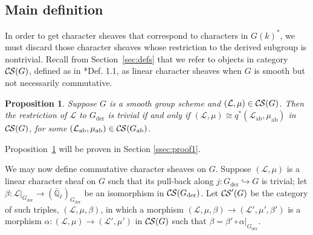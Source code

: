 \documentclass[10pt]{amsart}
\theoremstyle{plain}
\newtheorem{proposition}[theorem]{Proposition}
\theoremstyle{definition}
\newcommand{\EE}{\mathbb{\bar Q}_\ell}
\newcommand{\der}{_{\operatorname{der}}}
\newcommand{\ab}{_{\operatorname{ab}}}
\newcommand{\cs}[1]{{\mathcal{#1}}}
\newcommand{\CS}{{\mathcal{C\hskip-0.8pt S}}}
\begin{document}
\subsection{Main definition}\label{ssec:noncomdef}

In order to get character sheaves that correspond to characters in $G(k)^*$, we must discard those
character sheaves whose restriction to the derived subgroup is nontrivial.
Recall from Section~\ref{sec:defs} that we refer to objects in category $\CS(G)$, defined as in \cite{cunningham-roe:13a}*{Def. 1.1}, as linear character sheaves  when $G$ is smooth but not necessarily commutative.

\begin{proposition} \label{prop:Gder_triv}
Suppose $G$ is a smooth group scheme and $(\cs{L},\mu) \in \CS(G)$.
Then the restriction of $\cs{L}$ to $G\der$ is trivial if and only if $(\cs{L},\mu) \cong q^*(\cs{L}\ab,\mu\ab)$ in $\CS(G)$, for some $(\cs{L}\ab,\mu\ab) \in \CS(G\ab)$.
\end{proposition}

Proposition~\ref{prop:Gder_triv} will be proven in Section \ref{ssec:proof1}.

We may now define commutative character sheaves on $G$.
%
Suppose $(\cs{L},\mu)$ is a linear character sheaf on $G$ such that its pull-back along
$j: G\der \hookrightarrow G$ is trivial;
let $\beta : \cs{L}\vert_{G\der} \to (\EE)_{G\der}$ be an isomorphism in $\CS(G\der)$.
Let $\CS'(G)$ be the category of such triples, $(\cs{L},\mu,\beta)$, in which a morphism $(\cs{L},\mu,\beta)\to (\cs{L}',\mu',\beta')$ is a morphism $\alpha : (\cs{L},\mu)\to (\cs{L}',\mu')$ in $\CS(G)$ such that $\beta = \beta' \circ \alpha\vert_{G\der}$.
%
\end{document}
